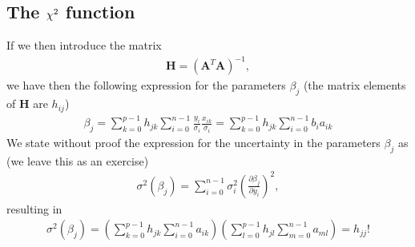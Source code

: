 \documentclass[letterpaper,10pt,english]{sphinxmanual}
\begin{document}
\subsection{The \protect\(\chi^2\protect\) function}
\label{\detokenize{chapter4:id6}}
If we then introduce the matrix
\begin{equation*}
\begin{split}
\boldsymbol{H} =  \left(\boldsymbol{A}^T\boldsymbol{A}\right)^{-1},
\end{split}
\end{equation*}
we have then the following expression for the parameters \(\beta_j\) (the matrix elements of \(\boldsymbol{H}\) are \(h_{ij}\))
\begin{equation*}
\begin{split}
\beta_j = \sum_{k=0}^{p-1}h_{jk}\sum_{i=0}^{n-1}\frac{y_i}{\sigma_i}\frac{x_{ik}}{\sigma_i} = \sum_{k=0}^{p-1}h_{jk}\sum_{i=0}^{n-1}b_ia_{ik}
\end{split}
\end{equation*}
We state without proof the expression for the uncertainty  in the parameters \(\beta_j\) as (we leave this as an exercise)
\begin{equation*}
\begin{split}
\sigma^2(\beta_j) = \sum_{i=0}^{n-1}\sigma_i^2\left( \frac{\partial \beta_j}{\partial y_i}\right)^2,
\end{split}
\end{equation*}
resulting in
\begin{equation*}
\begin{split}
\sigma^2(\beta_j) = \left(\sum_{k=0}^{p-1}h_{jk}\sum_{i=0}^{n-1}a_{ik}\right)\left(\sum_{l=0}^{p-1}h_{jl}\sum_{m=0}^{n-1}a_{ml}\right) = h_{jj}!
\end{split}
\end{equation*}
\end{document}
